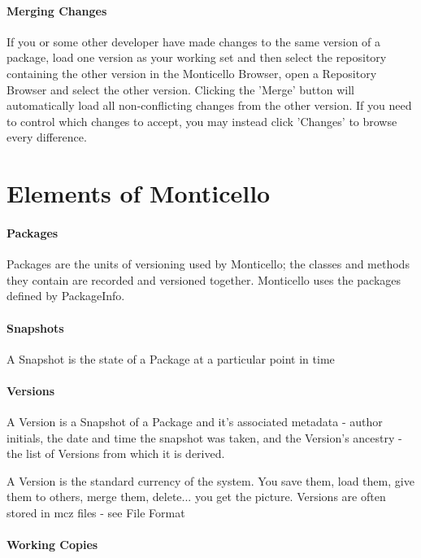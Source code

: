 \paragraph{Merging Changes}

If you or some other developer have made changes to the same version of a package, load one version as your working set and then select the repository containing the other version in the Monticello Browser, open a Repository Browser and select the other version. Clicking the 'Merge' button will automatically load all non-conflicting changes from the other version. If you need to control which changes to accept, you may instead click 'Changes' to browse every difference.



\section{Elements of Monticello}

\paragraph{Packages}

Packages are the units of versioning used by Monticello; the classes and methods they contain are recorded and versioned together. Monticello uses the packages defined by PackageInfo.

\paragraph{Snapshots}

A Snapshot is the state of a Package at a particular point in time

\paragraph{Versions}

A Version is a Snapshot of a Package and it's associated metadata - author initials, the date and time the snapshot was taken, and the Version's ancestry - the list of Versions from which it is derived.

A Version is the standard currency of the system. You save them, load them, give them to others, merge them, delete... you get the picture. Versions are often stored in mcz files - see File Format

\paragraph{Working Copies}

